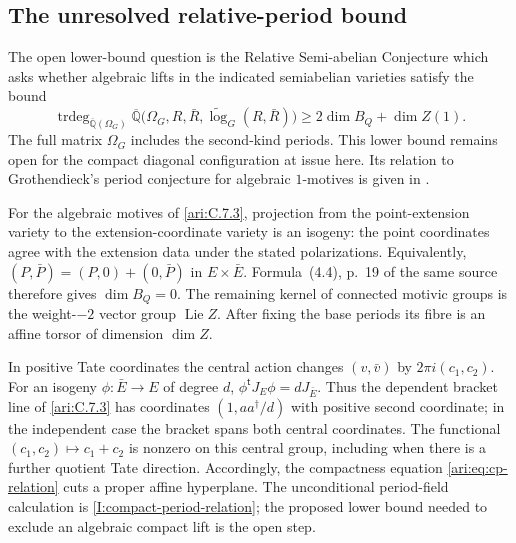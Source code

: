 \subsection{The unresolved relative-period bound}
\hypertarget{tag-001D}{}\label{ari:C.7.4}

The open lower-bound question is the Relative Semi-abelian Conjecture
\cite[Conjecture~4.7, arXiv v2, p.~18]{bertolin2022} which asks whether algebraic lifts in the indicated semiabelian
varieties satisfy the bound
\[
 \operatorname{trdeg}_{\overline{\mathbb Q}(\Omega_G)}
 \overline{\mathbb Q}\bigl(\Omega_G,R,\bar R,
                   \widetilde{\log}_G(R,\bar R)\bigr)
 \geq 2\dim B_Q+\dim Z(1).
\]
The full matrix $\Omega_G$ includes the second-kind periods.
This lower bound remains open for the compact diagonal
configuration at issue here. Its relation to Grothendieck's
period conjecture for algebraic $1$-motives is given in
\cite[Proposition~4.12, arXiv v2, pp.~19--20]{bertolin2022}.

For the algebraic motives of \cref{ari:C.7.3}, projection
from the point-extension variety to the extension-coordinate
variety is an isogeny: the point coordinates agree with the
extension data under the stated polarizations.
Equivalently, $(P,\bar P)=(P,0)+(0,\bar P)$ in
$E\times\bar E$. Formula~(4.4), p.~19 of the same source
therefore gives $\dim B_Q=0$.
The remaining kernel of connected motivic groups is the
weight-$-2$ vector group $\operatorname{Lie}Z$.
After fixing the base periods its fibre is an affine torsor
of dimension $\dim Z$.

In positive Tate coordinates the central action changes
$(v,\bar v)$ by $2\pi i(c_1,c_2)$.
For an isogeny $\phi:\bar E\to E$ of degree $d$,
$\phi^{\mathsf t}J_E\phi=dJ_{\bar E}$.
Thus the dependent bracket line of \cref{ari:C.7.3}
has coordinates $(1,aa^\dagger/d)$ with positive second
coordinate; in the independent case the bracket spans both
central coordinates.
The functional $(c_1,c_2)\mapsto c_1+c_2$ is nonzero
on this central group, including when there is a further
quotient Tate direction.
Accordingly, the compactness equation
\eqref{ari:eq:cp-relation} cuts a proper affine hyperplane.
The unconditional period-field calculation is
\cref{I:compact-period-relation}; the proposed lower bound
needed to exclude an algebraic compact lift is the open step.

